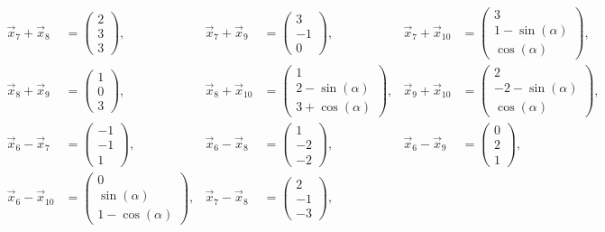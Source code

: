 \documentclass[11pt]{exam}
\begin{document}
\begin{questions}
\begin{solution}
\begin{align*}
		\vec{x}_7+\vec{x}_8&=\left(\begin{array}{c}2\\3\\3\end{array}\right),&
		\vec{x}_7+\vec{x}_9&=\left(\begin{array}{c}3\\-1\\0\end{array}\right),&
		\vec{x}_7+\vec{x}_{10}&=\left(\begin{array}{c}3\\1-\sin(\alpha)\\\cos(\alpha)\end{array}\right),\\
		\vec{x}_8+\vec{x}_9&=\left(\begin{array}{c}1\\0\\3\end{array}\right),&
		\vec{x}_8+\vec{x}_{10}&=\left(\begin{array}{c}1\\2-\sin(\alpha)\\3+\cos(\alpha)\end{array}\right),&
		\vec{x}_9+\vec{x}_{10}&=\left(\begin{array}{c}2\\-2-\sin(\alpha)\\\cos(\alpha)\end{array}\right),\\
		\vec{x}_6-\vec{x}_7&=\left(\begin{array}{c}-1\\-1\\1\end{array}\right),&
		\vec{x}_6-\vec{x}_8&=\left(\begin{array}{c}1\\-2\\-2\end{array}\right),&
		\vec{x}_6-\vec{x}_9&=\left(\begin{array}{c}0\\2\\1\end{array}\right),\\
		\vec{x}_6-\vec{x}_{10}&=\left(\begin{array}{c}0\\\sin(\alpha)\\1-\cos(\alpha)\end{array}\right),&
		\vec{x}_7-\vec{x}_8&=\left(\begin{array}{c}2\\-1\\-3\end{array}\right),&

\end{align*}
\end{solution}
\end{questions}
\end{document}
